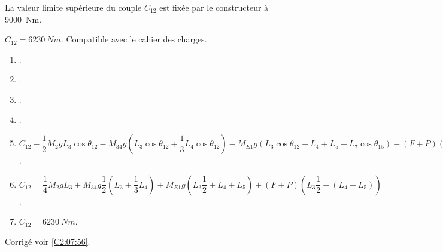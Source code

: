 La valeur limite supérieure du couple $C_{12}$ est fixée par le constructeur à \SI{9000}{Nm}.

\ifprof
 $C_{12} = \SI{6230}{Nm}$. Compatible avec le cahier des charges. 
\else
\fi







\ifprof
\else
\footnotesize
\begin{enumerate}
\item .
\item .
\item .
\item .
\item $
C_{12} -\dfrac{1}{2}M_2gL_3 \cos \theta_{12}
  -M_{34}g\left( L_3\cos\theta_{12} +\dfrac{1}{3}L_4\cos\theta_{12}\right)
  -M_{E1}g\left( L_3 \cos\theta_{12}+L_4+L_5+L_7 \cos\theta_{15}\right) 
  -(F+P)\left(  L_3 \sin\left(\theta_{15}-\theta_{12} \right)+ \left(L_4+L_5\right)\sin\left(\theta_{15} \right)-l_5 \cos\left(\theta_{15}  \right)  \right) 
  = 0
$.
\item $
C_{12} 
= \dfrac{1}{4}M_2gL_3 
  +M_{34}g\dfrac{1}{2}\left( L_3 +\dfrac{1}{3}L_4\right)
  +M_{E1}g\left( L_3 \dfrac{1}{2}+L_4+L_5 \right) 
  +(F+P)\left(  L_3 \dfrac{1}{2}- \left(L_4+L_5\right)  \right) 
$.
\item $C_{12} = \SI{6230}{Nm}$.
\end{enumerate}
\normalsize


\begin{flushright}
\footnotesize{Corrigé  voir \ref{C2:07:56}.}
\end{flushright}%
\fi 